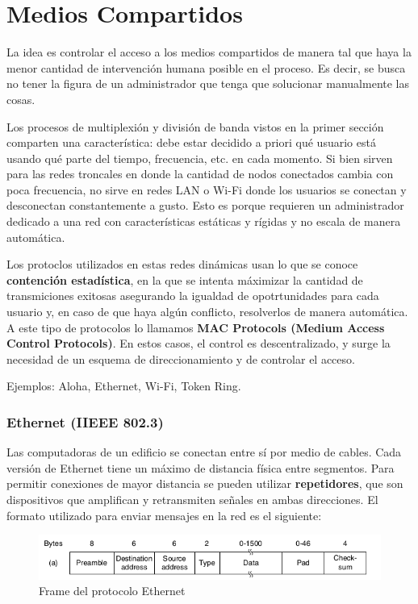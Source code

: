 \part{Medios Compartidos}
La idea es controlar el acceso a los medios compartidos de manera tal que haya la menor cantidad de intervención humana posible en el proceso. Es decir, se busca no tener la figura de un administrador que tenga que solucionar manualmente las cosas.

Los procesos de multiplexión y división de banda vistos en la primer sección comparten una característica: debe estar decidido a priori qué usuario está usando qué parte del tiempo, frecuencia, etc. en cada momento. Si bien sirven para las redes troncales en donde la cantidad de nodos conectados cambia con poca frecuencia, no sirve en redes LAN o Wi-Fi donde los usuarios se conectan y desconectan constantemente a gusto. Esto es porque requieren un administrador dedicado a una red con características estáticas y rígidas y no escala de manera automática.

Los protoclos utilizados en estas redes dinámicas usan lo que se conoce \textbf{contención estadística}, en la que se intenta máximizar la cantidad de transmiciones exitosas asegurando la igualdad de opotrtunidades para cada usuario y, en caso de que haya algún conflicto, resolverlos de manera automática. A este tipo de protocolos lo llamamos \textbf{MAC Protocols (Medium Access Control Protocols)}. En estos casos, el control es descentralizado, y surge la necesidad de un esquema de direccionamiento y de controlar el acceso.

Ejemplos: Aloha, Ethernet, Wi-Fi, Token Ring.

\section{Ethernet (IIEEE 802.3)}
Las computadoras de un edificio se conectan entre sí por medio de cables. Cada versión de Ethernet tiene un máximo de distancia física entre segmentos. Para permitir conexiones de mayor distancia se pueden utilizar \textbf{repetidores}, que son dispositivos que amplifican y retransmiten señales en ambas direcciones.
El formato utilizado para enviar mensajes en la red es el siguiente:

\begin{figure}[H]
	\centering
	\includegraphics[width=\textwidth
]{images/ethernet-mac-frame.png}
	\caption[Frame del protocolo Ethernet]{Frame del protocolo Ethernet}
	\label{fig:ethernet-mac-frame}
\end{figure}

